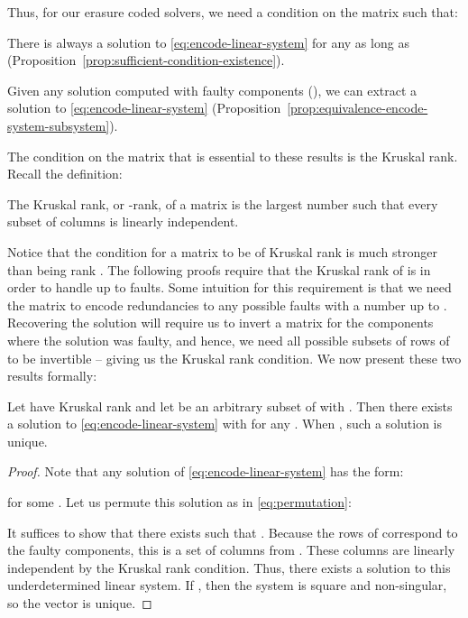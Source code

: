 \documentclass[11pt]{article}
\begin{document}
Thus, for our erasure coded solvers, we need a condition on the matrix  such that: 
\begin{compactenum}
\item There is always a solution to \eqref{eq:encode-linear-system} for any  as long
as  (Proposition~\ref{prop:sufficient-condition-existence}).
\item Given any solution computed with faulty components (), we can extract
a solution to \eqref{eq:encode-linear-system}
(Proposition~\ref{prop:equivalence-encode-system-subsystem}).
\end{compactenum} 
The condition on the matrix  that is essential to these results is the Kruskal rank.
Recall the definition: 
\begin{definition}
The Kruskal rank, or -rank, of a matrix is the largest number  such that every
subset of  columns is linearly independent.
\end{definition}
Notice that the condition for a matrix to be of Kruskal rank  is much stronger than
being rank . The following proofs require that the Kruskal rank of  is 
in order to handle up to  faults. Some intuition for this requirement is that
we need the matrix  to encode redundancies to any possible faults with a number
up to . Recovering the solution will require us to invert a matrix for the
components where the solution was faulty, and hence, we need all possible subsets
of  rows of  to be invertible -- giving us the Kruskal rank condition.
We now present these two results formally:

\begin{proposition} 
Let  have Kruskal rank  and let  be an
arbitrary subset of  with . Then there exists a solution to
\eqref{eq:encode-linear-system} with  for any .
When , such a solution is unique.
\label{prop:sufficient-condition-existence}
\end{proposition}
\begin{proof}
Note that any solution of \eqref{eq:encode-linear-system} has the form: 

for some . Let us permute this solution as in \eqref{eq:permutation}: 

It suffices to show that there exists  such that .
Because the rows of  correspond to the faulty components, this is a set
of  columns from . These columns are linearly independent by the
Kruskal rank condition. Thus, there exists a solution to this underdetermined
linear system. If , then the system is square and non-singular, so
the vector  is unique. 
\end{proof}
\end{document}
